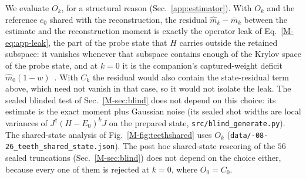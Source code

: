 \documentclass[aps,prb,onecolumn,superscriptaddress,longbibliography,floatfix]{revtex4-2}
\begin{document}
We evaluate $O_k$, for a structural reason (Sec.~\ref{app:estimator}). With $O_k$ and the reference $e_0$ shared with the reconstruction, the residual $\widehat m_k-\bar m_k$ between the estimate and the reconstruction moment is exactly the operator leak of Eq.~\eqref{M-eq:app-leak}, the part of the probe state that $H$ carries outside the retained subspace: it vanishes whenever that subspace contains enough of the Krylov space of the probe state, and at $k=0$ it is the companion's captured-weight deficit $\widehat m_0(1-w)$~\cite{SQDspec2608}. With $C_k$ the residual would also contain the state-residual term above, which need not vanish in that case, so it would not isolate the leak. The sealed blinded test of Sec.~\ref{M-sec:blind} does not depend on this choice: its estimate is the exact moment plus Gaussian noise (its sealed shot widths are local variances of $J^\dagger(H-E_0)^kJ$ on the prepared state, \texttt{src/\allowbreak blind\_generate.py}). The shared-state analysis of Fig.~\ref{M-fig:teethshared} uses $O_k$ (\texttt{data/-08-26\_teeth\_shared\_state.json}). The post hoc shared-state rescoring of the $56$ sealed truncations (Sec.~\ref{M-sec:blind}) does not depend on the choice either, because every one of them is rejected at $k=0$, where $O_0=C_0$.
\end{document}
